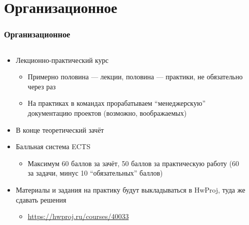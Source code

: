 \documentclass{../../slides-style}
\begin{document}
    \begin{frame}[plain]
        \titlepage
    \end{frame}

    \section{Организационное}

    \begin{frame}
        \frametitle{Организационное}
        \begin{columns}
            \begin{column}{0.7\textwidth}
                \begin{itemize}
                    \item Лекционно-практический курс
                    \begin{itemize}
                        \item Примерно половина --- лекции, половина --- практики, не обязательно через раз
                        \item На практиках в командах прорабатываем \enquote{менеджерскую} документацию проектов (возможно, воображаемых)
                    \end{itemize}
                    \item В конце теоретический зачёт
                    \item Балльная система ECTS
                    \begin{itemize}
                        \item Максимум 60 баллов за зачёт, 50 баллов за практическую работу (60 за задачи, минус 10 \enquote{обязательных} баллов)
                    \end{itemize}
                    \item Материалы и задания на практику будут выкладываться в HwProj, туда же сдавать решения
                    \begin{itemize}
                        \item \url{https://hwproj.ru/courses/40033}
                    \end{itemize}
                \end{itemize}
            \end{column}
            \begin{column}{0.3\textwidth}
                \begin{center}

\end{center}
\end{column}
\end{columns}
\end{frame}
\end{document}
